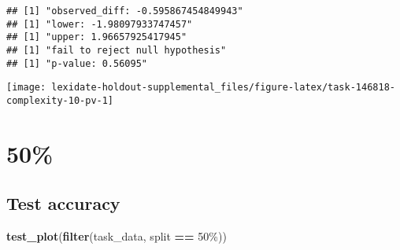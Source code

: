 \documentclass[
]{book}
\newenvironment{Shaded}{\begin{snugshade}}{\end{snugshade}}
\newcommand{\AttributeTok}[1]{\textcolor[rgb]{0.13,0.29,0.53}{#1}}
\newcommand{\DecValTok}[1]{\textcolor[rgb]{0.00,0.00,0.81}{#1}}
\newcommand{\FunctionTok}[1]{\textcolor[rgb]{0.13,0.29,0.53}{\textbf{#1}}}
\newcommand{\NormalTok}[1]{#1}
\newcommand{\OtherTok}[1]{\textcolor[rgb]{0.56,0.35,0.01}{#1}}
\newcommand{\SpecialCharTok}[1]{\textcolor[rgb]{0.81,0.36,0.00}{\textbf{#1}}}
\newcommand{\StringTok}[1]{\textcolor[rgb]{0.31,0.60,0.02}{#1}}
\begin{document}
\begin{Shaded}
\end{Shaded}

\begin{verbatim}
## [1] "observed_diff: -0.595867454849943"
## [1] "lower: -1.98097933747457"
## [1] "upper: 1.96657925417945"
## [1] "fail to reject null hypothesis"
## [1] "p-value: 0.56095"
\end{verbatim}

\texttt{[image: lexidate-holdout-supplemental\_files/figure-latex/task-146818-complexity-10-pv-1]}

\hypertarget{section-2}{%
\section{50\%}\label{section-2}}

\hypertarget{test-accuracy-2}{%
\subsection{Test accuracy}\label{test-accuracy-2}}

\begin{Shaded}
\begin{Highlighting}[]
\FunctionTok{test\_plot}\NormalTok{(}\FunctionTok{filter}\NormalTok{(task\_data, split }\SpecialCharTok{==} \StringTok{\textquotesingle{}50\%\textquotesingle{}}\NormalTok{))}
\end{Highlighting}
\end{Shaded}
\end{document}
